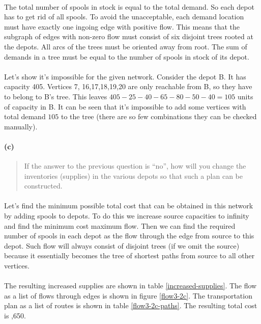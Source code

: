 \paragraph{}
The total number of spools in stock is equal to the total demand. So each depot has to get rid of all spools. To avoid the unacceptable, each demand location must have exactly one ingoing edge with positive flow. This means that the subgraph of edges with non-zero flow must consist of six disjoint trees rooted at the depots. All arcs of the trees must be oriented away from root. The sum of demands in a tree must be equal to the number of spools in stock of its depot.

\paragraph{}
Let's show it's impossible for the given network. Consider the depot B. It has capacity 405. Vertices 7, 16,17,18,19,20 are only reachable from B, so they have to belong to B's tree. This leaves $405-25-40-65-80-50-40=105$ units of capacity in B. It can be seen that it's impossible to add some vertices with total demand $105$ to the tree (there are so few combinations they can be checked manually).

\paragraph{(c)}
\begin{quote}
If the answer to the previous question is ``no'', how will you change the inventories (supplies) in the various depots so that such a plan can be constructed.
\end{quote}

\paragraph{}
Let's find the minimum possible total cost that can be obtained in this network by adding spools to depots. To do this we increase source capacities to infinity and find the minimum cost maximum flow. Then we can find the required number of spools in each depot as the flow through the edge from source to this depot. Such flow will always consist of disjoint trees (if we omit the source) because it essentially becomes the tree of shortest paths from source to all other vertices.

\paragraph{}
The resulting increased supplies are shown in table \ref{increased-supplies}. The flow as a list of flows through edges is shown in figure \ref{flow3-2c}. The transportation plan as a list of routes is shown in table \ref{flow3-2c-paths}. The resulting total cost is ,650.

